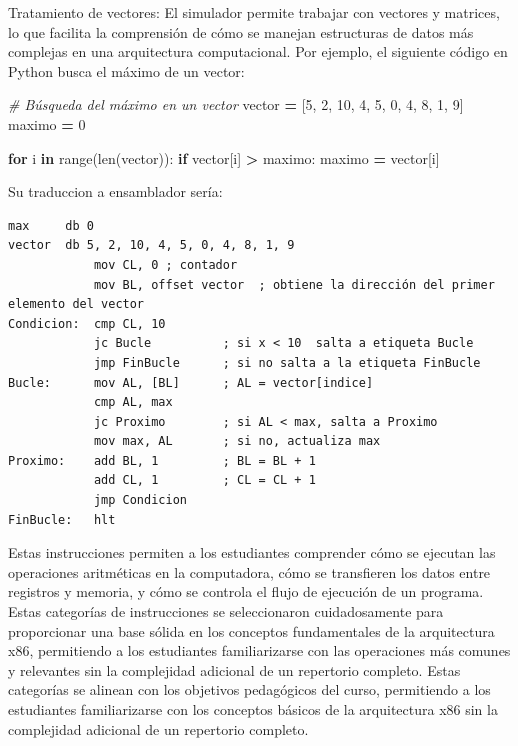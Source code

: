 \documentclass[12pt,oneside]{templates/unerthesis}
\newenvironment{Shaded}{\begin{snugshade}}{\end{snugshade}}
\newcommand{\BuiltInTok}[1]{#1}
\newcommand{\CommentTok}[1]{\textcolor[rgb]{0.56,0.35,0.01}{\textit{#1}}}
\newcommand{\ControlFlowTok}[1]{\textcolor[rgb]{0.13,0.29,0.53}{\textbf{#1}}}
\newcommand{\DecValTok}[1]{\textcolor[rgb]{0.00,0.00,0.81}{#1}}
\newcommand{\KeywordTok}[1]{\textcolor[rgb]{0.13,0.29,0.53}{\textbf{#1}}}
\newcommand{\NormalTok}[1]{#1}
\newcommand{\OperatorTok}[1]{\textcolor[rgb]{0.81,0.36,0.00}{\textbf{#1}}}
\begin{document}
Tratamiento de vectores: El simulador permite trabajar con vectores y matrices, lo que facilita la comprensión de cómo se manejan estructuras de datos más complejas en una arquitectura computacional. Por ejemplo, el siguiente código en Python busca el máximo de un vector:

\begin{Shaded}
\begin{Highlighting}[]
\CommentTok{\# Búsqueda del máximo en un vector}
\NormalTok{vector }\OperatorTok{=}\NormalTok{ [}\DecValTok{5}\NormalTok{, }\DecValTok{2}\NormalTok{, }\DecValTok{10}\NormalTok{, }\DecValTok{4}\NormalTok{, }\DecValTok{5}\NormalTok{, }\DecValTok{0}\NormalTok{, }\DecValTok{4}\NormalTok{, }\DecValTok{8}\NormalTok{, }\DecValTok{1}\NormalTok{, }\DecValTok{9}\NormalTok{]}
\NormalTok{maximo }\OperatorTok{=} \DecValTok{0}

\ControlFlowTok{for}\NormalTok{ i }\KeywordTok{in} \BuiltInTok{range}\NormalTok{(}\BuiltInTok{len}\NormalTok{(vector)):}
    \ControlFlowTok{if}\NormalTok{ vector[i] }\OperatorTok{\textgreater{}}\NormalTok{ maximo:}
\NormalTok{        maximo }\OperatorTok{=}\NormalTok{ vector[i]}
\end{Highlighting}
\end{Shaded}

Su traduccion a ensamblador sería:

\begin{lstlisting}
max     db 0
vector  db 5, 2, 10, 4, 5, 0, 4, 8, 1, 9
            mov CL, 0 ; contador
            mov BL, offset vector  ; obtiene la dirección del primer elemento del vector
Condicion:  cmp CL, 10 
            jc Bucle          ; si x < 10  salta a etiqueta Bucle
            jmp FinBucle      ; si no salta a la etiqueta FinBucle
Bucle:      mov AL, [BL]      ; AL = vector[indice] 
            cmp AL, max
            jc Proximo        ; si AL < max, salta a Proximo
            mov max, AL       ; si no, actualiza max
Proximo:    add BL, 1         ; BL = BL + 1 
            add CL, 1         ; CL = CL + 1            
            jmp Condicion 
FinBucle:   hlt
\end{lstlisting}

Estas instrucciones permiten a los estudiantes comprender cómo se ejecutan las operaciones aritméticas en la computadora, cómo se transfieren los datos entre registros y memoria, y cómo se controla el flujo de ejecución de un programa.
Estas categorías de instrucciones se seleccionaron cuidadosamente para proporcionar una base sólida en los conceptos fundamentales de la arquitectura x86, permitiendo a los estudiantes familiarizarse con las operaciones más comunes y relevantes sin la complejidad adicional de un repertorio completo.
Estas categorías se alinean con los objetivos pedagógicos del curso, permitiendo a los estudiantes familiarizarse con los conceptos básicos de la arquitectura x86 sin la complejidad adicional de un repertorio completo.
\end{document}
